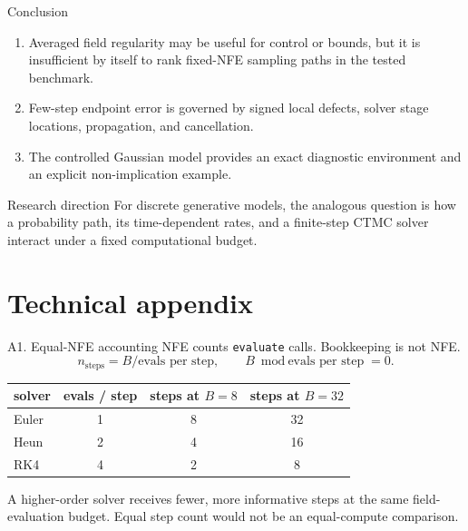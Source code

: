 \documentclass[aspectratio=169,10pt,c]{beamer}
\begin{document}
\begin{frame}{Conclusion}
  \small
  \begin{enumerate}\itemsep=0.35em
    \item Averaged field regularity may be useful for control or bounds, but
          it is insufficient by itself to rank fixed-NFE sampling paths in
          the tested benchmark.
    \item Few-step endpoint error is governed by signed local defects, solver
          stage locations, propagation, and cancellation.
    \item The controlled Gaussian model provides an exact diagnostic
          environment and an explicit non-implication example.
  \end{enumerate}

  \vspace{0.18cm}
  \begin{block}{Research direction}
    For discrete generative models, the analogous question is how a
    probability path, its time-dependent rates, and a finite-step CTMC
    solver interact under a fixed computational budget.
  \end{block}
\end{frame}

\appendix
\section{Technical appendix}

\begin{frame}{A1. Equal-NFE accounting}
  \small
  NFE counts \texttt{evaluate} calls. Bookkeeping is not NFE.
  \[
    n_{\mathrm{steps}} = B\big/\text{evals per step},
    \qquad B \bmod \text{evals per step} = 0.
  \]
  \begin{center}
  \begin{tabular}{lccc}
    \toprule
    solver & evals / step & steps at \(B=8\) & steps at \(B=32\) \\
    \midrule
    Euler & 1 & 8 & 32 \\
    Heun  & 2 & 4 & 16 \\
    RK4   & 4 & 2 & 8 \\
    \bottomrule
  \end{tabular}
  \end{center}
  \vspace{0.18cm}
  A higher-order solver receives fewer, more informative steps at the same
  field-evaluation budget. Equal step count would not be an equal-compute
  comparison.
\end{frame}
\end{document}
